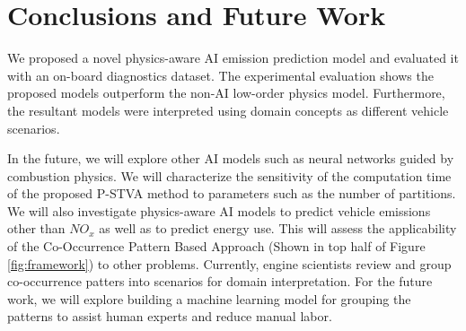 \documentclass[letterpaper]{article} %
\begin{document}



\section{Conclusions and Future Work}
We proposed a novel physics-aware AI emission prediction model and evaluated it with an on-board diagnostics dataset. The experimental evaluation shows the proposed models outperform the non-AI low-order physics model. Furthermore, the resultant models were interpreted using domain concepts as different vehicle scenarios.

In the future, we will explore other AI models such as neural networks guided by combustion physics.  We will characterize the sensitivity of the computation time of the proposed P-STVA method to parameters such as the number of partitions.  We will also investigate physics-aware AI models to predict vehicle emissions other than $NO_{x}$ as well as to predict energy use. This will assess the applicability of the Co-Occurrence Pattern Based Approach (Shown in top half of Figure \ref{fig:framework}) to other problems. Currently, engine scientists review and group co-occurrence patters into scenarios for domain interpretation. For the future work, we will explore building a machine learning model for grouping the patterns to assist human experts and reduce manual labor. 
\end{document}
